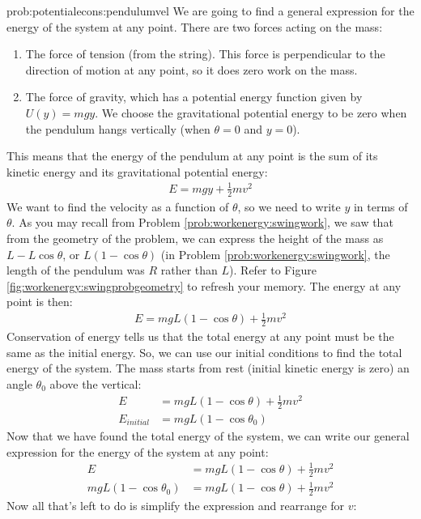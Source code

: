 \begin{solution}{prob:potentialecons:pendulumvel}\label{soln:potentialecons:pendulumvel}
We are going to find a general expression for the energy of the system at any point. There are two forces acting on the mass:
\begin{enumerate}
\item The force of tension (from the string). This force is perpendicular to the direction of motion at any point, so it does zero work on the mass. 
\item The force of gravity, which has a potential energy function given by $U(y)=mgy$. We choose the gravitational potential energy to be zero when the pendulum hangs vertically (when $\theta=0$ and $y=0$). 
\end{enumerate}
This means that the energy of the pendulum at any point is the sum of its kinetic energy and its gravitational potential energy:
\begin{align*}
E=mgy+\frac{1}{2}mv^2
\end{align*}
We want to find the velocity as a function of $\theta$, so we need to write $y$ in terms of $\theta$. As you may recall from Problem \ref{prob:workenergy:swingwork}, we saw that from the geometry of the problem, we can express the height of the mass as $L-L\cos\theta$, or $L(1-\cos\theta)$ (in Problem \ref{prob:workenergy:swingwork}, the length of the pendulum was $R$ rather than $L$). Refer to Figure \ref{fig:workenergy:swingprobgeometry} to refresh your memory. The energy at any point is then:
\begin{align*}
E=mgL(1-\cos\theta)+\frac{1}{2}mv^2
\end{align*}
Conservation of energy tells us that the total energy at any point must be the same as the initial energy. So, we can use our initial conditions to find the total energy of the system. The mass starts from rest (initial kinetic energy is zero) an angle $\theta_0$ above the vertical:
\begin{align*}
E&=mgL(1-\cos\theta)+\frac{1}{2}mv^2\\
E_{initial}&=mgL(1-\cos\theta_0)
\end{align*} 
Now that we have found the total energy of the system, we can write our general expression for the energy of the system at any point:
\begin{align*}
E&=mgL(1-\cos\theta)+\frac{1}{2}mv^2\\
mgL(1-\cos\theta_0)&=mgL(1-\cos\theta)+\frac{1}{2}mv^2
\end{align*}
Now all that's left to do is simplify the expression and rearrange for $v$:

\end{solution}
